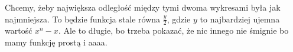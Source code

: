 \documentclass{article}
\begin{document}
\begin{center}
\end{center}

Chcemy, żeby największa odległość między tymi dwoma wykresami była jak najmniejsza. To będzie funkcja stale równa $\frac y2$, gdzie $y$ to najbardziej ujemna wartość $x^n-x$. Ale to długie, bo trzeba pokazać, że nic innego nie śmignie bo mamy funkcję prostą i aaaa.
\end{document}
